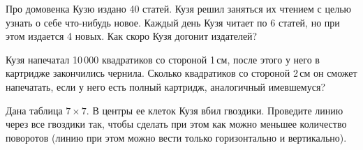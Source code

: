 ﻿
\begin{itemize}

\itA Про домовенка Кузю издано 40 статей. Кузя решил заняться их чтением с целью узнать о себе что-нибудь новое. Каждый день Кузя читает по 6 статей, но при этом издается 4 новых. Как скоро Кузя догонит издателей?

\itB Кузя напечатал 10\,000 квадратиков со стороной 1\,см, после этого у него в картридже закончились чернила. Сколько квадратиков со стороной 2\,см он сможет напечатать, если у него есть полный картридж, аналогичный имевшемуся?

\itC Дана таблица $7 \times 7$. В центры ее клеток Кузя вбил гвоздики. Проведите линию через все гвоздики так, чтобы сделать при этом как можно меньшее количество поворотов (линию при этом можно вести только горизонтально и вертикально).
\end{itemize}